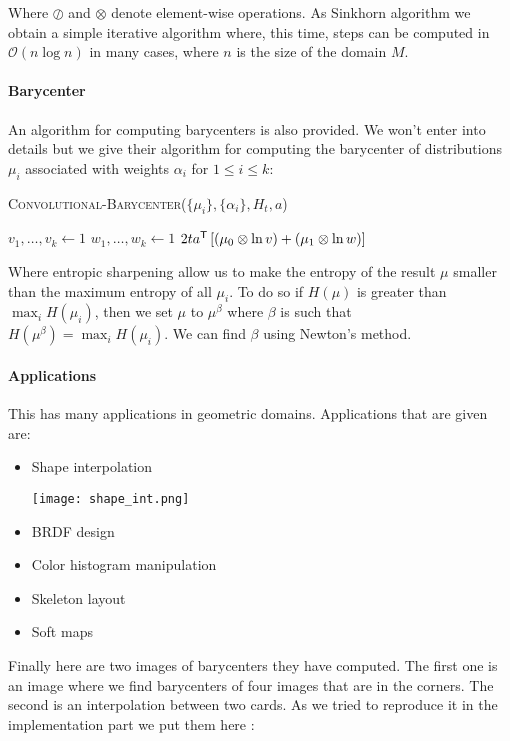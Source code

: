Where $\oslash$ and $\otimes$ denote element-wise operations. As Sinkhorn algorithm we obtain a simple iterative algorithm where, this time, steps can be computed in $\mathcal{O}(n \log n)$ in many cases, where $n$ is the size of the domain $M$.

\paragraph{Barycenter}
An algorithm for computing barycenters is also provided. We won't enter into details but we give their algorithm for computing the barycenter of distributions $\mu_i$ associated with weights $\alpha_i$ for $1 \leqslant i \leqslant k$:

\vspace{3mm}
\begin{algorithm}[H]
	\caption{\textsc{Convolutional-Barycenter}($\{\mu_i\}, \{ \alpha_i \}, H_t, a$)}
	$v_1, \dots, v_k \gets 1$ \;
	$w_1, \dots, w_k \gets 1$ \;
	\Return $2t a^{\mathsf{T}} \left[ \left( \mu_0 \otimes \ln v \right) + \left( \mu_1 \otimes \ln w \right) \right]$
\end{algorithm}
\vspace{3mm}
Where entropic sharpening allow us to make the entropy of the result $\mu$ smaller than the maximum entropy of all $\mu_i$. To do so if $H(\mu)$ is greater than $\max_i H(\mu_i)$, then we set $\mu$ to $\mu^\beta$ where $\beta$ is such that $H(\mu^\beta) = \max_i H(\mu_i)$. We can find $\beta$ using Newton's method.

\paragraph{Applications}
This has many applications in geometric domains. Applications that are given are:
\begin{itemize}
	\item Shape interpolation
		\begin{center}
		\texttt{[image: shape\_int.png]}
		\end{center}
	\item BRDF design
	\item Color histogram manipulation
	\item Skeleton layout
	\item Soft maps
\end{itemize}
Finally here are two images of barycenters they have computed. The first one is an image where we find barycenters of four images that are in the corners. The second is an interpolation between two cards. As we tried to reproduce it in the implementation part we put them here :

